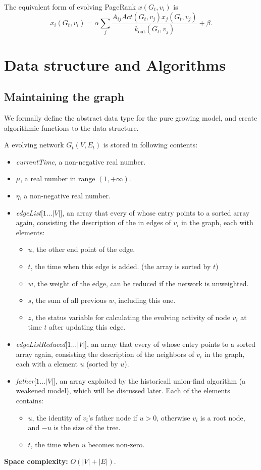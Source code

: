 \documentclass[12pt,abstract=true]{scrartcl}
\numberwithin{equation}{section}
\theoremstyle{definition}   \newtheorem{definition}{Definition}[section]
\theoremstyle{plain}        \newtheorem{theorem}{Theorem}[section]
\theoremstyle{plain}        \newtheorem{observation}{Observation}[section]
\theoremstyle{plain}        \newtheorem{fact}{Fact}[section]
\theoremstyle{plain}        \newtheorem{claim}{Claim}[section]
\theoremstyle{plain}        \newtheorem{lemma}[theorem]{Lemma}
\theoremstyle{plain}        \newtheorem{corollary}[theorem]{Corollary}
\theoremstyle{remark}       \newtheorem{example}{Example}[section]
\theoremstyle{remark}       \newtheorem{remark}{Remark}[section]
\begin{document}
The equivalent form of evolving PageRank $x(G_t,v_i)$ is 
\begin{equation}
x_i(G_t,v_i)=\alpha\sum_j
\frac{A_{ij}\mathit{Act}(G_t,v_j)x_j(G_t,v_j)}{k_{\mathrm{out}}(G_t,v_j)}
+\beta.
\end{equation}

\section{Data structure and Algorithms}
\subsection{Maintaining the graph}
We formally define the abstract data type for the pure growing model, and
create algorithmic functions to the data structure.

A evolving network $G_t(V,E_t)$ is stored in following contents:
\begin{itemize}
\item \textit{currentTime}, a non-negative real number.
\item $\mu$, a real number in range $(1,+\infty)$.
\item $\eta$, a non-negative real number.
\item \textit{edgeList}[$1\dots|V|$], an array that every of
whose entry points to a sorted array again, consisting the description of the
in edges of $v_i$ in the graph, each with elements:
\begin{itemize}
\item $u$, the other end point of the edge.
\item $t$, the time when this edge is added. (the array is sorted by $t$)
\item $w$, the weight of the edge, can be reduced if the network is
unweighted.
\item $s$, the sum of all previous $w$, including this one.
\item $z$, the status variable for calculating the evolving activity of node
$v_i$ at time $t$ after updating this edge.
\end{itemize}

\item \textit{edgeListReduced}[$1\dots|V|$], an array that every of
whose entry points to a sorted array again, consisting the description of the
neighbors of $v_i$ in the graph, each with a element $u$ (sorted by $u$).

\item \textit{father}[$1\dots|V|$], an array exploited by the historicall
union-find algorithm\cite{tarjan1975efficiency} (a weakened model), which
will be discussed later. Each of the elements contains:
\begin{itemize}
\item $u$, the identity of $v_i$'s father node if $u>0$, otherwise $v_i$
is a root node, and $-u$ is the size of the tree.
\item $t$, the time when $u$ becomes non-zero.
\end{itemize}

\end{itemize}
\textbf{Space complexity:} $O(|V|+|E|)$.
\end{document}
